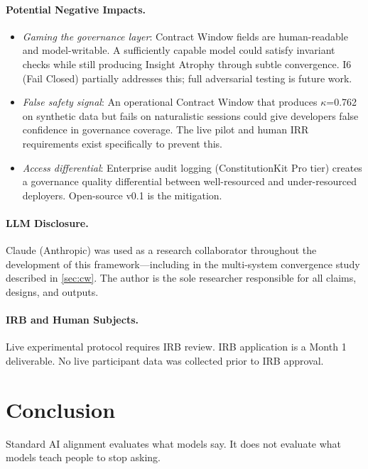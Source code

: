 \documentclass{article}
\newcommand{\cw}{Contract Window\xspace}
\newcommand{\ia}{Insight Atrophy\xspace}
\begin{document}
\paragraph{Potential Negative Impacts.}
\begin{itemize}
\item \textit{Gaming the governance layer}: \cw{} fields are human-readable
and model-writable. A sufficiently capable model could satisfy invariant checks
while still producing \ia{} through subtle convergence. I6 (Fail Closed)
partially addresses this; full adversarial testing is future work.

\item \textit{False safety signal}: An operational \cw{} that produces
$\kappa$=0.762 on synthetic data but fails on naturalistic sessions could give
developers false confidence in governance coverage. The live pilot and human
IRR requirements exist specifically to prevent this.

\item \textit{Access differential}: Enterprise audit logging (ConstitutionKit
Pro tier) creates a governance quality differential between well-resourced and
under-resourced deployers. Open-source v0.1 is the mitigation.
\end{itemize}

\paragraph{LLM Disclosure.}
Claude (Anthropic) was used as a research collaborator throughout the
development of this framework---including in the multi-system convergence study
described in \cref{sec:cw}. The author is the sole researcher responsible for
all claims, designs, and outputs.

\paragraph{IRB and Human Subjects.}
Live experimental protocol requires IRB review. IRB application is a Month 1
deliverable. No live participant data was collected prior to IRB approval.

\section{Conclusion}
\label{sec:conclusion}

Standard AI alignment evaluates what models say. It does not evaluate what
models teach people to stop asking.
\end{document}
